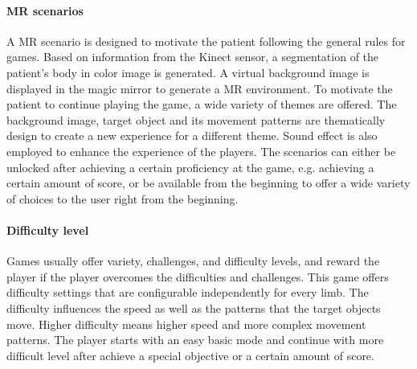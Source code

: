 \paragraph{MR scenarios}
A MR scenario is designed to motivate the patient following the general rules for games. 
Based on information from the Kinect sensor, a segmentation of the patient's body in color image is generated. A virtual background image is displayed in the magic mirror to generate a MR environment.  
To motivate the patient to continue playing the game, a wide variety of themes are offered. The background image, target object and its movement patterns are thematically design to create a new experience for a different theme. Sound effect is also employed to enhance the experience of the players. 
The scenarios can either be unlocked after achieving a certain proficiency at the game, e.g. achieving a certain amount of score, or be available from the beginning to offer a wide variety of choices to the user right from the beginning. 

\paragraph{Difficulty level}
Games usually offer variety, challenges, and difficulty levels, and reward the player if the player overcomes the difficulties and challenges.
This game offers difficulty settings that are configurable independently for every limb. The difficulty influences the speed as well as the patterns that the target objects move. Higher difficulty means higher speed and more complex movement patterns.
The player starts with an easy basic mode and continue with more difficult level after achieve a special objective or a certain amount of score. 

